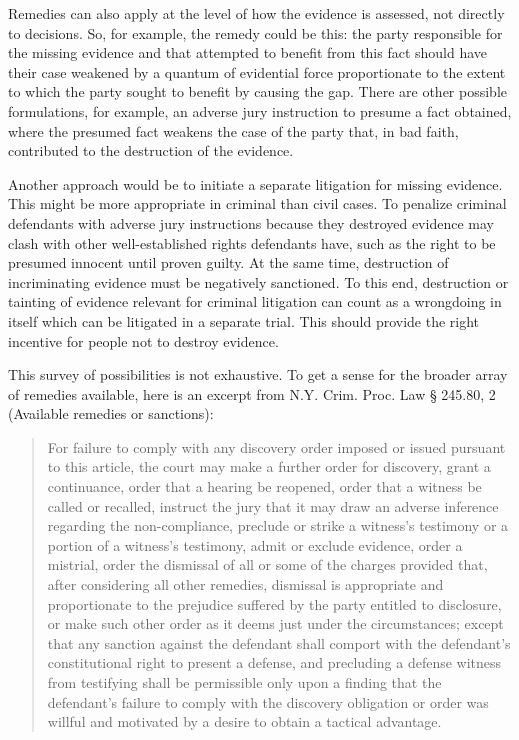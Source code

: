 \documentclass[
  10pt,
  dvipsnames,enabledeprecatedfontcommands]{scrartcl}
\begin{document}
Remedies can also apply at the level of how the evidence is assessed,
not directly to decisions. So, for example, the remedy could be this:
the party responsible for the missing evidence and that attempted to
benefit from this fact should have their case weakened by a quantum of
evidential force proportionate to the extent to which the party sought
to benefit by causing the gap. There are other possible formulations,
for example, an adverse jury instruction to presume a fact obtained,
where the presumed fact weakens the case of the party that, in bad
faith, contributed to the destruction of the evidence.

Another approach would be to initiate a separate litigation for missing
evidence. This might be more appropriate in criminal than civil cases.
To penalize criminal defendants with adverse jury instructions because
they destroyed evidence may clash with other well-established rights
defendants have, such as the right to be presumed innocent until proven
guilty. At the same time, destruction of incriminating evidence must be
negatively sanctioned. To this end, destruction or tainting of evidence
relevant for criminal litigation can count as a wrongdoing in itself
which can be litigated in a separate trial. This should provide the
right incentive for people not to destroy evidence.

This survey of possibilities is not exhaustive. To get a sense for the
broader array of remedies available, here is an excerpt from N.Y. Crim.
Proc. Law § 245.80, 2 (Available remedies or sanctions):

\begin{quote}
For failure to comply with any discovery order imposed or issued
pursuant to this article, the court may make a further order for
discovery, grant a continuance, order that a hearing be reopened, order
that a witness be called or recalled, instruct the jury that it may draw
an adverse inference regarding the non-compliance, preclude or strike a
witness's testimony or a portion of a witness's testimony, admit or
exclude evidence, order a mistrial, order the dismissal of all or some
of the charges provided that, after considering all other remedies,
dismissal is appropriate and proportionate to the prejudice suffered by
the party entitled to disclosure, or make such other order as it deems
just under the circumstances; except that any sanction against the
defendant shall comport with the defendant's constitutional right to
present a defense, and precluding a defense witness from testifying
shall be permissible only upon a finding that the defendant's failure to
comply with the discovery obligation or order was willful and motivated
by a desire to obtain a tactical advantage.
\end{quote}
\end{document}
